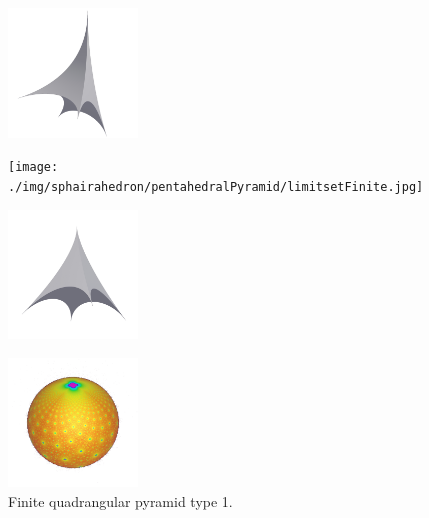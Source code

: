 \documentclass[suppldata, dvipdfmx]{interact}
\theoremstyle{plain}%
\theoremstyle{definition}
\theoremstyle{remark}
\theoremstyle{problemstyle}
\begin{document}
\begin{figure}[H]
 \begin{minipage}{0.5\textwidth}
  \begin{minipage}[t]{0.24\textwidth}
   \centering
   \includegraphics[width=1.35in, height=1.35in, keepaspectratio]{./img/sphairahedron/pentahedralPyramid/sphairahedronFinite.jpg}
   \label{fig:pentahedralPyramidSphairahedronFinite1}
  \end{minipage}
  \hspace*{\fill}
  \begin{minipage}[t]{0.24\textwidth}
   \centering
   \texttt{[image: ./img/sphairahedron/pentahedralPyramid/limitsetFinite.jpg]}
   \label{fig:pentahedralPyramidLimitsetFinite1}
  \end{minipage}
  \hspace*{\fill}
  \caption{Finite quadrangular pyramid type 1.}
  \label{fig:pentahedralPyramidFinite}
 \end{minipage}
 \hspace*{\fill}
 \begin{minipage}{0.5\textwidth}
\begin{minipage}[t]{0.24\textwidth}
   \centering
   \includegraphics[width=1.35in, height=1.35in, keepaspectratio]{./img/sphairahedron/pentahedralPyramid/sphairahedronFiniteType1.jpg}
 \label{fig:pentahedralPyramidSphairahedronFinite2}
  \end{minipage}
  \hspace*{\fill}
  \begin{minipage}[t]{0.24\textwidth}
   \centering
   \includegraphics[width=1.35in, height=1.35in, keepaspectratio]{./img/sphairahedron/pentahedralPyramid/limitsetFiniteType1.jpg}

\end{minipage}
\end{minipage}
\end{figure}
\end{document}
